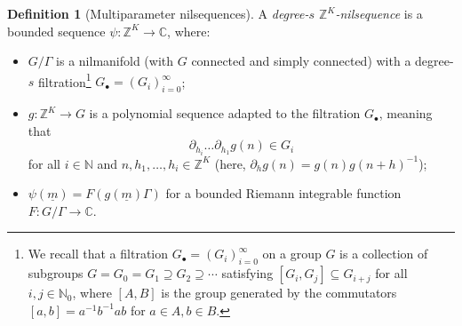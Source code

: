 \documentclass[11pt]{amsart}
\theoremstyle{definition}
\newtheorem{definition}[lemma]{Definition}
\newcommand{\C}{{\mathbb C}}
\newcommand{\N}{{\mathbb N}}
\newcommand{\R}{{\mathbb R}}
\newcommand{\Z}{{\mathbb Z}}
\newcommand{\um}{{\underline{m}}}
\newcommand{\inv}{^{-1}}
\newcommand{\1}{{\mathbf{1}}}
\begin{document}

\begin{definition}[Multiparameter nilsequences]
    A \textit{degree-$s$ $\Z^{K}$-nilsequence} is a bounded sequence  $\psi:\Z^{K}\to\C$, where: 
    \begin{itemize}
        \item $G/\Gamma$ is a nilmanifold (with $G$ connected and simply connected) with a degree-$s$ filtration\footnote{We recall that a filtration $G_\bullet = (G_i)_{i=0}^\infty$ on a group $G$ is a collection of subgroups $G = G_0=G_1\supseteq G_2 \supseteq \cdots$ satisfying $[G_i, G_j]\subseteq G_{i+j}$ for all $i,j\in\N_0$, where $[A,B]$ is the group generated by the commutators $[a,b]=a\inv b\inv a b$ for $a\in A, b\in B$.} $G_\bullet = (G_i)_{i=0}^\infty$;
        \item $g:\Z^{K}\to G$ is a polynomial sequence adapted to the filtration $G_\bullet$, meaning that $$\partial_{h_{i}}\dots\partial_{h_{1}}g(n)\in G_{i}$$
        for all $i\in\N$ and $n,h_{1},\dots,h_{i}\in\Z^{K}$ (here, $\partial_h g(n) = g(n)g(n+h)\inv$); 
        \item $\psi(\um) = F(g(\um)\Gamma)$ for a bounded Riemann integrable function $F:G/\Gamma\to\C$.
    \end{itemize}
\end{definition}

\end{document}
